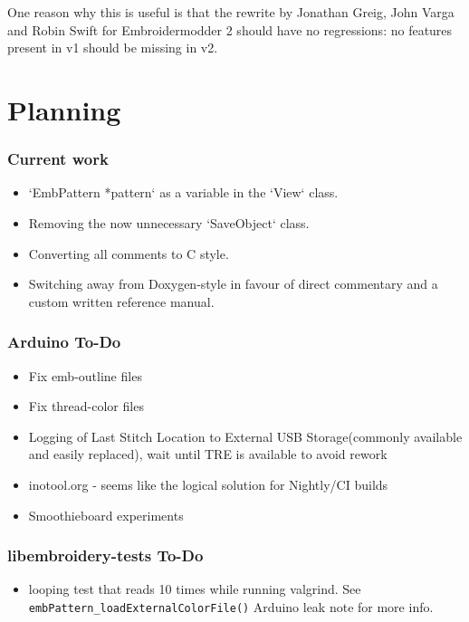 \documentclass[10pt]{report}
\begin{document}
One reason why this is useful is that the rewrite by Jonathan Greig, John Varga
and Robin Swift for Embroidermodder 2 should have no regressions: no features
present in v1 should be missing in v2.

\chapter{Planning}

\subsection{Current work}

\begin{itemize}
\item `EmbPattern *pattern` as a variable in the `View` class.
\item Removing the now unnecessary `SaveObject` class.
\item Converting all comments to C style.
\item Switching away from Doxygen-style in favour of direct commentary and a custom written reference manual.
\end{itemize}

\subsection{Arduino To-Do}

\begin{itemize}
\item Fix emb-outline files
\item Fix thread-color files
\item Logging of Last Stitch Location to External USB Storage(commonly available and easily replaced), wait until TRE is available to avoid rework
\item inotool.org - seems like the logical solution for Nightly/CI builds
\item Smoothieboard experiments
\end{itemize}

\subsection{libembroidery-tests To-Do}

\begin{itemize}
\item looping test that reads 10 times while running valgrind. See \texttt{embPattern\_loadExternalColorFile()} Arduino leak note for more info.
\end{itemize}
\end{document}
